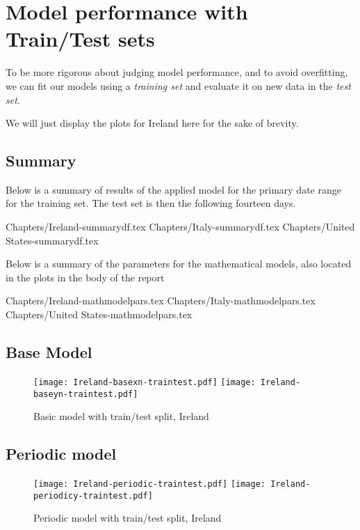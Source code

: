 \section{Model performance with Train/Test sets}
\label{ch:traintest}

To be more rigorous about judging model performance, and to avoid overfitting, we can fit our models using a \textit{training set} and evaluate it on new data in the \textit{test set}.

We will just display the plots for Ireland here for the sake of brevity.

\subsection{Summary}
Below is a summary of results of the applied model for the primary date range for the training set. The test set is then the following fourteen days.

{Chapters/Ireland-summarydf.tex}
{Chapters/Italy-summarydf.tex}
{Chapters/United States-summarydf.tex}

Below is a summary of the parameters for the mathematical models, also located in the plots in the body of the report

{Chapters/Ireland-mathmodelpars.tex}
{Chapters/Italy-mathmodelpars.tex}
{Chapters/United States-mathmodelpars.tex}

\subsection{Base Model}
\begin{figure}[H]
  \texttt{[image: Ireland-basexn-traintest.pdf]} \label{fig:ireland-basexn-traintest}
\endminipage\hfill
{}
  \texttt{[image: Ireland-baseyn-traintest.pdf]} \label{fig:ireland-baseyn-traintest}
\endminipage
\caption{Basic model with train/test split, Ireland}
\end{figure}

\subsection{Periodic model}
\begin{figure}[H]
  \texttt{[image: Ireland-periodic-traintest.pdf]} \label{fig:ireland-periodic-traintest}
\endminipage\hfill
{}
  \texttt{[image: Ireland-periodicy-traintest.pdf]} \label{fig:ireland-periodicy-traintest}
\endminipage
\caption{Periodic model with train/test split, Ireland}
\end{figure}



